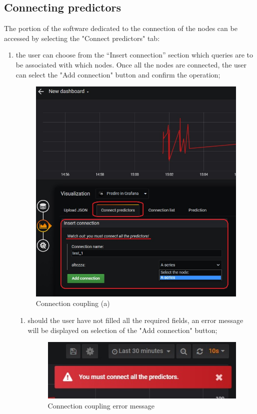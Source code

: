 \subsection{Connecting predictors}
The portion of the software dedicated to the connection of the nodes can be accessed by selecting the "Connect predictors" tab:
\begin{enumerate}
	\item the user can choose from the “Insert connection” section which queries are to be associated with which nodes.
	Once all the nodes are connected, the user can select the "Add connection" button and confirm the operation;
	
\begin{figure}[H]
\centering
\includegraphics[scale=0.75]{img/plug-in/plugin_3.JPG}
\caption{Connection coupling (a)}
\end{figure}



\begin{enumerate}
\item should the user have not filled all the required fields, an error message will be displayed on selection of the "Add connection" button;

	
\begin{figure}[H]
\centering
\includegraphics[scale=0.60]{img/plug-in/plugin_4.JPG}
\caption{Connection coupling error message}
\end{figure}


\end{enumerate}
\end{enumerate}
